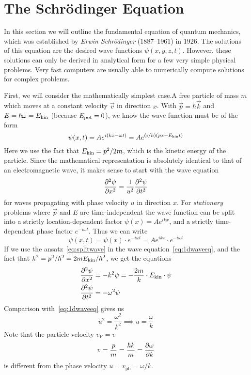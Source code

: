 \documentclass[../../script.tex]{subfiles}
\begin{document}
\section[The Schrödinger Equation]{The Schrödinger Equation}

In this section we will outline the fundamental equation of quantum mechanics, which was established by \textit{Erwin Schrödinger} (1887--1961) in 1926.
The solutions of this equation are the desired wave functions $\psi(x, y, z, t)$. However, these solutions can only be derived in analytical form for a few very simple physical problems.
Very fast computers are usually able to numerically compute solutions for complex problems.

First, we will consider the mathematically simplest case.A free particle of mass $m$ which moves at a constant velocity $\vec{v}$ in direction $x$.
With $\vec{p} = \hbar\vec{k}$ and $E = \hbar \omega = E_{\text{kin}}$ (because $E_{\text{pot}} = 0$), we know the wave function must be of the form 
\begin{equation}\label{eq:wavefuncform}
	\psi(x, t) = Ae^{i(kx-\omega t)} = Ae^{(i/\hbar)(px-E_{\text{kin}} t)}
\end{equation}
Here we use the fact that $E_{\text{kin}} = p^2 / 2m$, which is the kinetic energy of the particle. Since the mathematical representation is absolutely identical to that of an electromagnetic wave,
it makes sense to start with the wave equation 
\begin{equation}\label{eq:1dwaveeq}
	\pdv[2]{\psi}{x} = \frac{1}{u^2} \pdv[2]{\psi}{t}
\end{equation}
for waves propagating with phase velocity $u$ in direction $x$. For \textit{stationary} problems where $\vec{p}$ and $E$ are time-independent the wave function can be split into a 
strictly location-dependent factor $\psi(x) = Ae^{ikx}$, and a strictly time-dependent phase factor $e^{-i\omega t}$. Thus we can write 
\begin{equation}\label{eq:splitwave}
	\psi(x, t) = \psi(x) \cdot e^{-i\omega t} = A e^{ikx} \cdot e^{-i\omega t}
\end{equation}
If we use the ansatz~\eqref{eq:splitwave} in the wave equation~\eqref{eq:1dwaveeq}, and the fact that $k^2 = p^2 / \hbar^2 = 2mE_{\text{kin}}/\hbar^2$, we get the equations
\begin{equation}\label{eq:values}
	\begin{split}
		&\pdv[2]{\psi}{x} = -k^2\psi = -\frac{2m}{k} \cdot E_{\text{kin}} \cdot \psi \\
		&\pdv[2]{\psi}{t} = -\omega^2 \psi
	\end{split}
\end{equation}
Comparison with~\eqref{eq:1dwaveeq} gives us 
\[
	u^2 = \frac{\omega^2}{k^2} \implies u = \frac{\omega}{k}
\]
Note that the particle velocity $v_\text{P} = v$ 
\[
	v = \frac{p}{m} = \frac{\hbar k}{m} = \pdv{\omega}{k}
\]
is different from the phase velocity $u = v_{\text{ph}} = \omega / k$.
\end{document}
